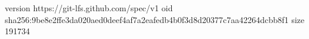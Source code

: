 version https://git-lfs.github.com/spec/v1
oid sha256:9be8e2ffe3da020aed0deef4af7a2eafedb4b0f3d8d20377c7aa42264dcbb8f1
size 191734
